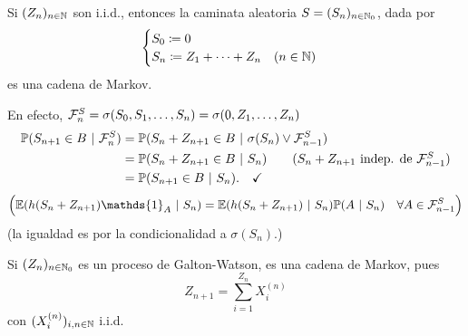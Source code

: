 \begin{eg}
	Si $(Z_{n})_{n \in \mathbb{N}}$ son i.i.d., entonces la caminata aleatoria $S = (S_{n})_{n \in \mathbb{N}_{0}}$, dada por
	\[ \begin{cases}
		S_{0} \coloneq 0 \\
		S_{n} \coloneq Z_{1} + \cdots + Z_{n} \quad (n \in \mathbb{N})
	\end{cases} \]
	es una cadena de Markov. \par
	En efecto, $\mathcal{F}_{n}^{S} = \sigma (S_{0}, S_{1}, \dots, S_{n}) = \sigma(0, Z_{1},\dots, Z_{n})$
	\begin{align*}
		\mbb{P}(S_{n+1} \in B \ | \ \mcal{F}_{n}^{S}) &= \mbb{P}(S_{n} + Z_{n+1} \in B \ | \ \sigma(S_{n}) \vee \mcal{F}_{n-1}^{S}) \\
		&= \mbb{P}(S_{n} + Z_{n+1} \in B \ | \ S_{n}) \tag{$S_{n} + Z_{n+1} \text{ indep. de } \mcal{F}_{n-1}^{S}$} \\
		&= \mbb{P}(S_{n+1} \in B \ | \ S_{n})
	.\quad\checkmark\end{align*}
	\[ \Big( \mbb{E}(h(S_{n} + Z_{n+1}) \mathds{1}_{A} \ | \ S_{n}) = \mbb{E}(h(S_{n} + Z_{n+1}) \ | \ S_{n}) \mbb{P}(A \ | \ S_{n}) \quad \forall A \in \mcal{F}_{n-1}^{S} \Big) \]
	(la igualdad es por la condicionalidad a $\sigma(S_{n})$.)
\end{eg}

\begin{eg}
	Si $(Z_{n})_{n \in \mathbb{N}_{0}}$ es un proceso de Galton-Watson, es una cadena de Markov, pues
	\[ Z_{n+1} = \sum_{i=1}^{Z_{n}} X_{i}^{(n)} \]
	con $(X_{i}^{(n)})_{i,n \in \mathbb{N}}$ i.i.d.
\end{eg}

